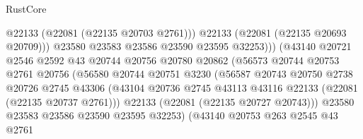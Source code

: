 \begin{lexlean}{RustCore}
\begin{coremodule}
                                          @22133
                                          (@22081 (@22135 @20703 @2761)))
                                        @22133
                                        (@22081 (@22135 @20693 @20709)))
                                      @23580
                                      @23583
                                      @23586
                                      @23590
                                      @23595
                                      @32253)))
                                (@43140
                                  @20721
                                  @2546
                                  @2592
                                  @43
                                  @20744
                                  @20756
                                  @20780
                                  @20862
                                  (@56573
                                    @20744
                                    @20753
                                    @2761
                                    @20756
                                    (@56580
                                      @20744
                                      @20751
                                      @3230
                                      (@56587
                                        @20743
                                        @20750
                                        @2738
                                        @20726
                                        @2745
                                        @43306
                                        (@43104
                                          @20736
                                          @2745
                                          @43113
                                          @43116
                                          @22133
                                          (@22081 (@22135 @20737 @2761)))
                                        @22133
                                        (@22081 (@22135 @20727 @20743)))
                                      @23580
                                      @23583
                                      @23586
                                      @23590
                                      @23595
                                      @32253)
                                    (@43140
                                      @20753
                                      @263
                                      @2545
                                      @43
                                      @2761

\end{coremodule}
\end{lexlean}
